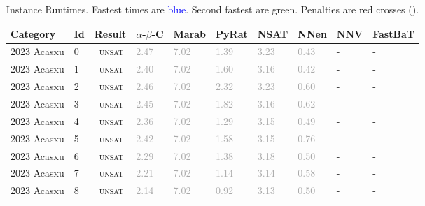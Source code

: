 

\begin{center}
{\setlength{\tabcolsep}{1pt}
\scriptsize
\begin{longtable}{@{}llllllllll@{}}
\caption{\footnotesize Instance Runtimes. Fastest times are \textcolor{blue}{blue}. Second fastest are \textcolor{second}{green}. Penalties are red crosses (\textbf{\textcolor{red}{}}).} \label{tab:all_results} \\
\toprule
\textbf{Category} & \textbf{Id} & \textbf{Result} & \textbf{$\alpha$-$\beta$-C} & \textbf{Marab} & \textbf{PyRat} & \textbf{NSAT} & \textbf{NNen} & \textbf{NNV} & \textbf{FastBaT} \\
\midrule
\endhead
2023 Acasxu & 0 & ~\textsc{unsat} & \textcolor{darkgray}{2.47} & \textcolor{darkgray}{7.02} & \textcolor{darkgray}{1.39} & \textcolor{darkgray}{3.23} & \textcolor{darkgray}{0.43} & - & - \\
2023 Acasxu & 1 & ~\textsc{unsat} & \textcolor{darkgray}{2.40} & \textcolor{darkgray}{7.02} & \textcolor{darkgray}{1.60} & \textcolor{darkgray}{3.16} & \textcolor{darkgray}{0.42} & - & - \\
2023 Acasxu & 2 & ~\textsc{unsat} & \textcolor{darkgray}{2.46} & \textcolor{darkgray}{7.02} & \textcolor{darkgray}{2.32} & \textcolor{darkgray}{3.23} & \textcolor{darkgray}{0.60} & - & - \\
2023 Acasxu & 3 & ~\textsc{unsat} & \textcolor{darkgray}{2.45} & \textcolor{darkgray}{7.02} & \textcolor{darkgray}{1.82} & \textcolor{darkgray}{3.16} & \textcolor{darkgray}{0.62} & - & - \\
2023 Acasxu & 4 & ~\textsc{unsat} & \textcolor{darkgray}{2.36} & \textcolor{darkgray}{7.02} & \textcolor{darkgray}{1.29} & \textcolor{darkgray}{3.15} & \textcolor{darkgray}{0.49} & - & - \\
2023 Acasxu & 5 & ~\textsc{unsat} & \textcolor{darkgray}{2.42} & \textcolor{darkgray}{7.02} & \textcolor{darkgray}{1.58} & \textcolor{darkgray}{3.15} & \textcolor{darkgray}{0.76} & - & - \\
2023 Acasxu & 6 & ~\textsc{unsat} & \textcolor{darkgray}{2.29} & \textcolor{darkgray}{7.02} & \textcolor{darkgray}{1.38} & \textcolor{darkgray}{3.18} & \textcolor{darkgray}{0.50} & - & - \\
2023 Acasxu & 7 & ~\textsc{unsat} & \textcolor{darkgray}{2.21} & \textcolor{darkgray}{7.02} & \textcolor{darkgray}{1.14} & \textcolor{darkgray}{3.14} & \textcolor{darkgray}{0.58} & - & - \\
2023 Acasxu & 8 & ~\textsc{unsat} & \textcolor{darkgray}{2.14} & \textcolor{darkgray}{7.02} & \textcolor{darkgray}{0.92} & \textcolor{darkgray}{3.13} & \textcolor{darkgray}{0.50} & - & - \\

\end{longtable}}
\end{center}
